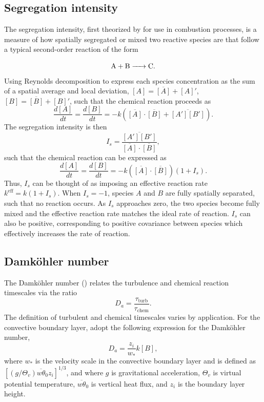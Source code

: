 \subsection{Segregation intensity}
The segregation intensity, first theorized by \cite{danckwerts_definition_1952} for use in combustion processes, is a measure of how spatially segregated or mixed two reactive species are that follow a typical second-order reaction of the form

\begin{equation}
\ce{A + B -> C}.
\end{equation}
Using Reynolds decomposition to express each species concentration as the sum of a spatial average and local deviation, $[A] = \overline{[A]} + [A]'$, $[B] = \overline{[B]} + [B]'$, such that the  chemical reaction proceeds as 
\begin{equation}
\frac{d[A]}{dt} = \frac{d[B]}{dt} = -k\left(\overline{[A]}\cdot\overline{[B]} + \overline{[A'][B']} \right).
\end{equation}
The segregation intensity is then 
\begin{equation}
I_s = \frac{\overline{[A'][B']}}{\overline{[A]}\cdot\overline{[B]}},
\end{equation}
such that the chemical reaction can be expressed as 
\begin{equation}
\frac{d[A]}{dt} = \frac{d[B]}{dt} = -k\left(\overline{[A]}\cdot\overline{[B]}\right)\left(1 + I_s \right).
\end{equation}
Thus, $I_s$ can be thought of as imposing an effective reaction rate $k^{\text{eff}} = k(1+I_s)$. When $I_s = -1$, species $A$ and $B$ are fully spatially separated, such that no reaction occurs. As $I_s$ approaches zero, the two species become fully mixed and the effective reaction rate matches the ideal rate of reaction. $I_s$ can also be positive, corresponding to positive covariance between species which effectively increases the rate of reaction.

\subsection{Damköhler number}
The Damköhler number (\cite{damköhler_effect_1947}) relates the turbulence and chemical reaction timescales via the ratio
\begin{equation}
D_a = \frac{\tau_{\text{turb}}}{\tau_{\text{chem}}}.
\end{equation}
The definition of turbulent and chemical timescales varies by application. For the convective boundary layer, \cite{vinuesa_fluxes_2003} adopt the following expression for the Damköhler number,
\begin{equation}
D_a = \frac{z_i}{w_*}k[B],
\end{equation}
where $w_*$ is the velocity scale in the convective boundary layer and is defined as $\left[(g/\Theta_v)\overline{w\theta}_0 z_i\right]^{1/3}$, and where $g$ is gravitational acceleration, $\Theta_v$ is virtual potential temperature, $\overline{w\theta}_0$ is vertical heat flux, and $z_i$ is the boundary layer height.

